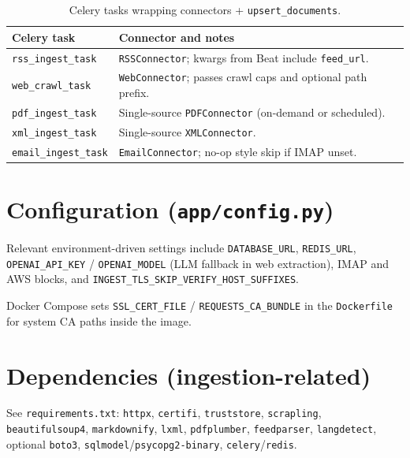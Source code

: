 \documentclass[11pt,a4paper]{article}
\begin{document}
\begin{table}[h]
\centering
\begin{tabular}{@{}lp{9cm}@{}}
\toprule
Celery task & Connector and notes \\
\midrule
\texttt{rss\_ingest\_task} & \texttt{RSSConnector}; kwargs from Beat include \texttt{feed\_url}. \\
\texttt{web\_crawl\_task} & \texttt{WebConnector}; passes crawl caps and optional path prefix. \\
\texttt{pdf\_ingest\_task} & Single-source \texttt{PDFConnector} (on-demand or scheduled). \\
\texttt{xml\_ingest\_task} & Single-source \texttt{XMLConnector}. \\
\texttt{email\_ingest\_task} & \texttt{EmailConnector}; no-op style skip if IMAP unset. \\
\bottomrule
\end{tabular}
\caption{Celery tasks wrapping connectors + \texttt{upsert\_documents}.}
\end{table}

\section{Configuration (\texttt{app/config.py})}

Relevant environment-driven settings include \texttt{DATABASE\_URL}, \texttt{REDIS\_URL},
\texttt{OPENAI\_API\_KEY} / \texttt{OPENAI\_MODEL} (LLM fallback in web extraction),
IMAP and AWS blocks, and \texttt{INGEST\_TLS\_SKIP\_VERIFY\_HOST\_SUFFIXES}.

Docker Compose sets \texttt{SSL\_CERT\_FILE} / \texttt{REQUESTS\_CA\_BUNDLE} in the
\texttt{Dockerfile} for system CA paths inside the image.

\section{Dependencies (ingestion-related)}

See \texttt{requirements.txt}: \texttt{httpx}, \texttt{certifi}, \texttt{truststore},
\texttt{scrapling}, \texttt{beautifulsoup4}, \texttt{markdownify}, \texttt{lxml},
\texttt{pdfplumber}, \texttt{feedparser}, \texttt{langdetect}, optional \texttt{boto3},
\texttt{sqlmodel}/\texttt{psycopg2-binary}, \texttt{celery}/\texttt{redis}.
\end{document}
